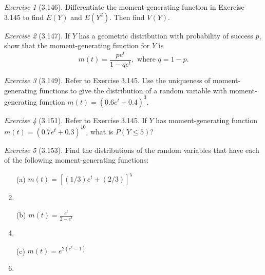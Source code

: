 \documentclass[12pt]{amsart}
\makeatletter
\theoremstyle{remark}
\newtheorem*{exercise}{Exercise}%
\renewenvironment{proof}[1][\proofname]{\par\doublespacing
  \pushQED{\qed}%
  \normalfont \topsep6\p@\@plus6\p@\relax
  \list{}{%
    \settowidth{\leftmargin}{\itshape\proofname:\hskip\labelsep}%
    \setlength{\labelwidth}{0pt}%
    \setlength{\itemindent}{-\leftmargin}%
  }%
  \item[\hskip\labelsep\itshape#1\@addpunct{:}]\ignorespaces
}{%
  \popQED\endlist\@endpefalse
  \singlespacing
}
\theoremstyle{mycomment}
\makeatother
\begin{document}
\begin{exercise}[3.146]
Differentiate the moment-generating function in Exercise 3.145 to find $E(Y)$ and $E(Y^2)$. Then find $V(Y)$.

\begin{proof}[Solution]
 
\end{proof}
\end{exercise}

\begin{exercise}[3.147]
If $Y$ has a geometric distribution with probability of success $p$, show that the moment-generating function for $Y$ is
$$m(t) = \frac{pe^t}{1 - qe^t}, \text{ where } q = 1 - p.$$

\begin{proof}[Solution]
 
\end{proof}
\end{exercise}

\begin{exercise}[3.149]
Refer to Exercise 3.145. Use the uniqueness of moment-generating functions to give the distribution of a random variable with moment-generating function $m(t) = (0.6e^t + 0.4)^3$.

\begin{proof}[Solution]
 
\end{proof}
\end{exercise}

\begin{exercise}[3.151]
Refer to Exercise 3.145. If $Y$ has moment-generating function $m(t) = (0.7e^t + 0.3)^{10}$, what is $P(Y \leq 5)$?

\begin{proof}[Solution]
 
\end{proof}
\end{exercise}

\begin{exercise}[3.153]
Find the distributions of the random variables that have each of the following moment-generating functions:

\begin{enumerate}
    \item[(a)] $m(t) = [(1/3)e^t + (2/3)]^5$
\begin{proof}[Solution]
 
\end{proof}
    \item[(b)] $m(t) = \frac{e^t}{2 - e^t}$
\begin{proof}[Solution]
 
\end{proof}
    \item[(c)] $m(t) = e^{2(e^t - 1)}$
\begin{proof}[Solution]
 
\end{proof}
\end{enumerate} 
\end{exercise}
\end{document}
